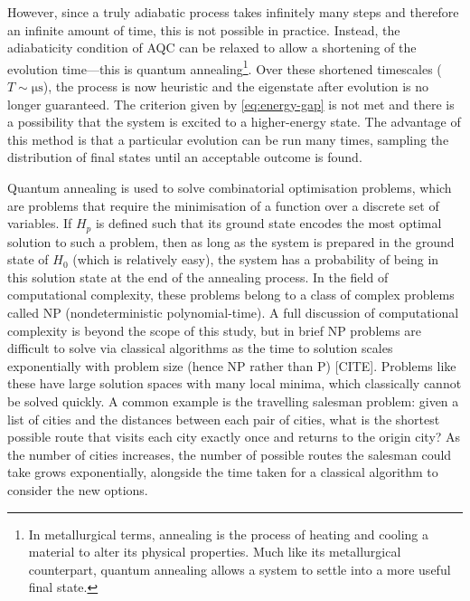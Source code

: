 \documentclass[12pt]{article}
\theoremstyle{definition}
\begin{document}
However, since a truly adiabatic process takes infinitely many steps and therefore an infinite amount of time, this is not possible in practice. Instead, the adiabaticity condition of AQC can be relaxed to allow a shortening of the evolution time---this is quantum annealing\footnote{In metallurgical terms, annealing is the process of heating and cooling a material to alter its physical properties. Much like its metallurgical counterpart, quantum annealing allows a system to settle into a more useful final state.}. Over these shortened timescales ($T\sim\unit{\us}$), the process is now heuristic and the eigenstate after evolution is no longer guaranteed. The criterion given by \cref{eq:energy-gap} is not met and there is a possibility that the system is excited to a higher-energy state. The advantage of this method is that a particular evolution can be run many times, sampling the distribution of final states until an acceptable outcome is found.

Quantum annealing is used to solve combinatorial optimisation problems, which are problems that require the minimisation of a function over a discrete set of variables. If $H_p$ is defined such that its ground state encodes the most optimal solution to such a problem, then as long as the system is prepared in the ground state of $H_0$ (which is relatively easy), the system has a probability of being in this solution state at the end of the annealing process. In the field of computational complexity, these problems belong to a class of complex problems called NP (nondeterministic polynomial-time). A full discussion of computational complexity is beyond the scope of this study, but in brief NP problems are difficult to solve via classical algorithms as the time to solution scales exponentially with problem size (hence NP rather than P) [CITE]. Problems like these have large solution spaces with many local minima, which classically cannot be solved quickly. A common example is the travelling salesman problem: given a list of cities and the distances between each pair of cities, what is the shortest possible route that visits each city exactly once and returns to the origin city? As the number of cities increases, the number of possible routes the salesman could take grows exponentially, alongside the time taken for a classical algorithm to consider the new options.
\end{document}
